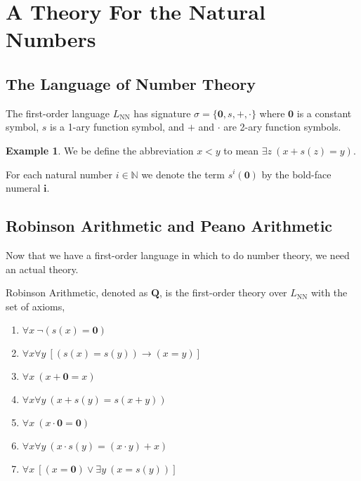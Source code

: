 \documentclass[12pt, leqno]{article}
\newcommand{\N}{\mathbb{N}}
\renewcommand{\bf}[1]{\mathbf{#1}}
\newcommand{\uq}[1]{\forall{#1} \:}
\newcommand{\eq}[1]{\exists{#1} \:}
\newenvironment{definition}[1][Definition:]{\begin{trivlist}
\item[\hskip \labelsep {\bfseries #1}]}{\end{trivlist}}
\theoremstyle{theorem}
\theoremstyle{definition}
\theoremstyle{definition}
\theoremstyle{remark}
\theoremstyle{definition}
\newtheorem{example}{Example}[section]
\theoremstyle{remark}
\begin{document}
\section{A Theory For the Natural Numbers}

\subsection{The Language of Number Theory}

\begin{definition}
The first-order language $L_{\text{NN}}$ has signature $\sigma = \{\bf{0}, s, +, \cdot\}$ where $\bf{0}$ is a constant symbol, $s$ is a 1-ary function symbol, and $+$ and $\cdot$ are 2-ary function symbols. 
\end{definition}

\begin{example}
We be define the abbreviation $x < y$ to mean $\eq{z} (x + s(z) = y)$. 
\end{example}

\begin{definition}
For each natural number $i \in \N$ we denote the term $s^i(\bf{0})$ by the bold-face numeral $\bf{i}$. 
\end{definition}

\subsection{Robinson Arithmetic and Peano Arithmetic}

Now that we have a first-order language in which to do number theory, we need an actual theory. 

\begin{definition}
Robinson Arithmetic, denoted as $\bf{Q}$, is the first-order theory over $L_{\text{NN}}$ with the set of axioms,
\begin{enumerate}
\item[(Q1)] $\uq{x} \neg (s(x) = \bf{0})$
\item[(Q2)] $\forall x \uq{y} [(s(x) = s(y)) \to (x = y)]$
\item[(Q3)] $\uq{x} (x + \bf{0} = x)$
\item[(Q4)] $\forall x \uq{y} (x + s(y) = s(x + y))$
\item[(Q5)] $\uq{x} (x \cdot \bf{0} = \bf{0})$
\item[(Q6)] $\forall x \uq{y} (x \cdot s(y) = (x \cdot y) + x)$
\item[(Q7)] $\uq{x} [(x = \bf{0}) \vee \eq{y} (x = s(y))]$ 
\end{enumerate}
\end{definition}
\end{document}
